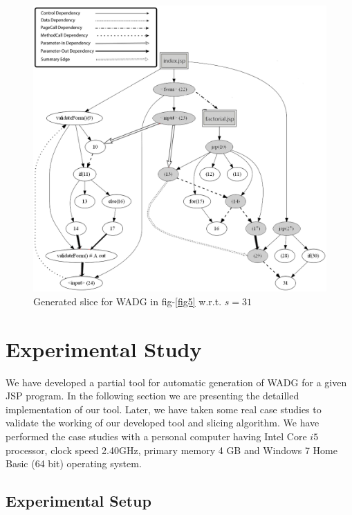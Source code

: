 \documentclass[11pt]{article}   %
\begin{document}
\begin{figure}
\begin{center}
\includegraphics[scale=.5]{slice_ll.png}
\caption{Generated slice for WADG in fig-\ref{fig5} w.r.t. $s=31$}
\label{fig6}
\end{center}
\end{figure}

\section{Experimental Study}

We have developed a partial tool for automatic generation of WADG for a given JSP program. In the following section we are presenting the detailled implementation of our tool. Later, we have taken some real case studies to validate the working of our developed tool and slicing algorithm. We have performed the case studies with a personal computer having Intel Core $i5$ processor, clock speed 2.40GHz, primary memory 4 GB and Windows 7 Home Basic (64 bit) operating system.   

\subsection{Experimental Setup}
\end{document}
